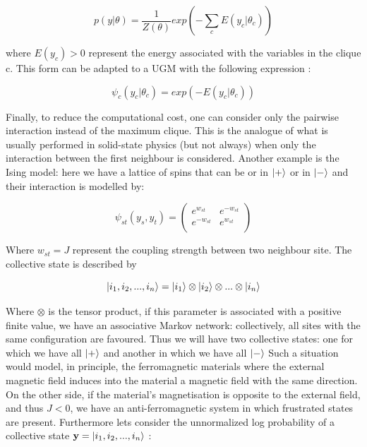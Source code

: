 \documentclass[12pt,%
               a4paper,%
               oneside,openany,%
               titlepage,%
               headinclude,footinclude,%
               BCOR5mm,%
               cleardoublepage=empty,%
               tablecaptionabove,%
               floatperchapter,
               ]{scrreprt}                 %
\begin{document}
\begin{equation}
p(y|\theta)=\dfrac{1}{Z(\theta)} exp\left(-\sum_{c}E(y_{c}|\theta_{c})\right)
\end{equation}

where $E(y_{c})>0$ represent the energy associated with the variables in the clique c.  This form can be adapted to a UGM with the following expression \cite{murphy2012machine}:

\begin{equation}
\psi_{c}(y_{c}|\theta_{c})=exp\left(-E(y_{c}|\theta_{c})\right)
\end{equation}

Finally, to reduce the computational cost,  one can consider only the pairwise interaction instead of the maximum clique. This is the analogue of what is usually performed in solid-state physics (but not always)  when only the interaction between the first neighbour is considered.  Another example is the  Ising model: here we have a lattice of spins that can be or in $\ket{+}$ or in $\ket{-}$ and their interaction is modelled by\cite{murphy2012machine}:


\begin{equation}
\psi_{st}\left(y_{s},y_{t}\right) =
\begin{pmatrix}
e^{w_{st}} & e^{-w_{st}} \\
e^{-w_{st}} & e^{w_{st}} \\
\end{pmatrix}
\end{equation}

Where $w_{st}=J$ represent the coupling strength between two neighbour site.  The collective state is described by 

\begin{equation}
\ket{i_{1},i_{2},...,i_{n}}=\ket{i_{1}}\otimes\ket{i_{2}}\otimes...\otimes\ket{i_{n}}
\end{equation}

Where $\otimes$ is the tensor product, if this parameter is associated with a positive finite value, we have an associative Markov network: collectively, all sites with the same configuration are favoured. Thus we will have two collective states: one for which we have all $\ket{+}$ and another in which we have all $\ket{-}$  Such a situation would model,  in principle,  the ferromagnetic materials where the external magnetic field induces into the material a magnetic field with the same direction.  On the other side, if the material's magnetisation is opposite to the external field,  and thus $J<0$,  we have an anti-ferromagnetic system in which frustrated states are present.  Furthermore lets consider the unnormalized log probability of a collective state $\textbf{y}=\ket{i_{1},i_{2},...,i_{n}}$ \cite{murphy2012machine}:
\end{document}
